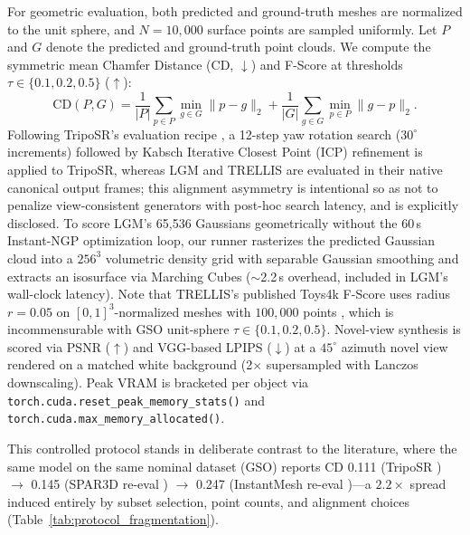 \documentclass[10pt, conference]{IEEEtran}
\begin{document}
For geometric evaluation, both predicted and ground-truth meshes are normalized to the unit sphere, and $N{=}10{,}000$ surface points are sampled uniformly. Let $P$ and $G$ denote the predicted and ground-truth point clouds. We compute the symmetric mean Chamfer Distance (CD, $\downarrow$) and F-Score at thresholds $\tau \in \{0.1, 0.2, 0.5\}$ ($\uparrow$):
\begin{equation}
\text{CD}(P, G) = \frac{1}{|P|}\sum_{p \in P}\min_{g \in G}\|p - g\|_2 + \frac{1}{|G|}\sum_{g \in G}\min_{p \in P}\|g - p\|_2.
\end{equation}
Following TripoSR's evaluation recipe \cite{triposr2024}, a 12-step yaw rotation search ($30^\circ$ increments) followed by Kabsch Iterative Closest Point (ICP) refinement is applied to TripoSR, whereas LGM and TRELLIS are evaluated in their native canonical output frames; this alignment asymmetry is intentional so as not to penalize view-consistent generators with post-hoc search latency, and is explicitly disclosed. To score LGM's 65{,}536 Gaussians geometrically without the 60\,s Instant-NGP optimization loop, our runner rasterizes the predicted Gaussian cloud into a $256^3$ volumetric density grid with separable Gaussian smoothing and extracts an isosurface via Marching Cubes ($\sim$2.2\,s overhead, included in LGM's wall-clock latency). Note that TRELLIS's published Toys4k F-Score uses radius $r{=}0.05$ on $[0,1]^3$-normalized meshes with $100{,}000$ points \cite{trellis2024}, which is incommensurable with GSO unit-sphere $\tau \in \{0.1, 0.2, 0.5\}$. Novel-view synthesis is scored via PSNR ($\uparrow$) and VGG-based LPIPS ($\downarrow$) at a $45^\circ$ azimuth novel view rendered on a matched white background (2$\times$ supersampled with Lanczos downscaling). Peak VRAM is bracketed per object via \texttt{torch.cuda.reset\_peak\_memory\_stats()} and \texttt{torch.cuda.max\_memory\_allocated()}.

This controlled protocol stands in deliberate contrast to the literature, where the same model on the same nominal dataset (GSO) reports CD 0.111 (TripoSR \cite{triposr2024}) $\rightarrow$ 0.145 (SPAR3D re-eval \cite{spar3d2025}) $\rightarrow$ 0.247 (InstantMesh re-eval \cite{instantmesh2024})---a $2.2\times$ spread induced entirely by subset selection, point counts, and alignment choices (Table~\ref{tab:protocol_fragmentation}).
\end{document}
